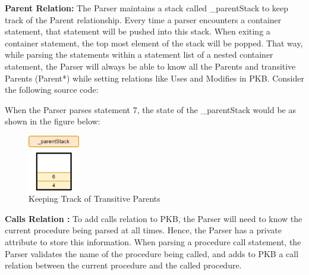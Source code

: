 \documentclass[12pt]{article}
\begin{document}
\textbf{Parent Relation:} The Parser maintains a stack called \_parentStack to keep track of the Parent relationship. Every time a parser encounters a container statement, that statement will be pushed into this stack. When exiting a container statement, the top most element of the stack will be popped. That way, while parsing the statements within a statement list of a nested container statement, the Parser will always be able to know all the Parents and transitive Parents (Parent*) while setting relations like Uses and Modifies in PKB. 
\newline
Consider the following source code:
\begin{center}
\end{center}
\vspace{10mm}
When the Parser parses statement 7, the state of the \_parentStack would be as shown in the figure below:

\begin{figure}[H]
  \caption{Keeping Track of Transitive Parents}
  \centering
    \includegraphics[width=0.2\textwidth]{Parser_AddingParentRelationToPKB.png}
\end{figure}
\textbf{Calls Relation
:} To add calls relation to PKB, the Parser will need to know the current procedure being parsed at all times. Hence, the Parser has a private attribute to store this information. When parsing a procedure call statement, the Parser validates the name of the procedure being called, and adds to PKB a call relation between the current procedure and the called procedure.\newline
\end{document}
